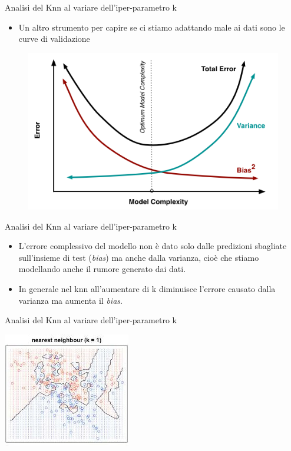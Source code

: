 \documentclass[11pt]{beamer}
\begin{document}
	\begin{frame}{Analisi del Knn al variare dell'iper-parametro k}
		\begin{itemize}
			\item Un altro strumento per capire se ci stiamo adattando male ai dati sono le curve di validazione
		\end{itemize}
		\begin{figure}
			\centering
			\includegraphics[width=0.7\linewidth]{img/biasvariance}
		\end{figure}
	\end{frame}
	\begin{frame}{Analisi del Knn al variare dell'iper-parametro k}
		\begin{itemize}
			\item L'errore complessivo del modello non \`e dato solo dalle predizioni sbagliate sull'insieme di test (\textit{bias}) ma anche dalla varianza, cio\`e che stiamo modellando anche il rumore generato dai dati.
			\item In generale nel knn all'aumentare di k diminuisce l'errore causato dalla varianza ma aumenta il \textit{bias}.
		\end{itemize}
	\end{frame}
	\begin{frame}{Analisi del Knn al variare dell'iper-parametro k}
		\begin{center}
			\includegraphics[width=0.8\linewidth]{img/1nn}
		\end{center}
	\end{frame}
\end{document}
